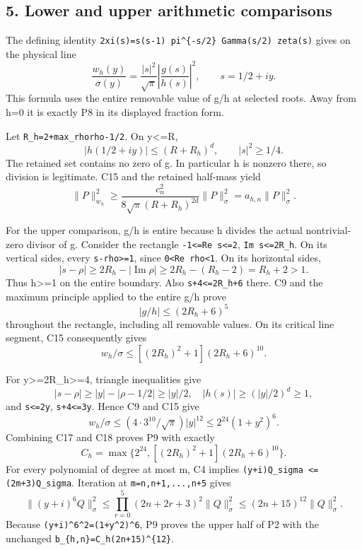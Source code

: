 \subsection{5. Lower and upper arithmetic comparisons}\label{mrcoerc:lower-and-upper-arithmetic-comparisons}

The defining identity \texttt{2xi(s)=s(s-1)\ pi\^{}\{-s/2\}\ Gamma(s/2)\ zeta(s)} gives on the physical line \[
\frac{w_h(y)}{\sigma(y)}=
 \frac{|s|^2}{\sqrt\pi}\left|\frac{g(s)}{h(s)}\right|^2,
 \qquad s=1/2+iy.
\tag{C15}
\] This formula uses the entire removable value of g/h at selected roots. Away from h=0 it is exactly P8 in its displayed fraction form.

Let \texttt{R\_h=2+max\_rho\textbar{}rho-1/2\textbar{}}. On \textbar y\textbar\textless=R, \[
|h(1/2+iy)|\le(R+R_h)^d,\qquad |s|^2\ge1/4.
\] The retained set contains no zero of g. In particular h is nonzero there, so division is legitimate. C15 and the retained half-mass yield \[
\|P\|_{w_h}^2\ge
\frac{c_n^2}{8\sqrt\pi(R+R_h)^{2d}}\|P\|_\sigma^2
=a_{h,n}\|P\|_\sigma^2.
\tag{C16}
\]

For the upper comparison, g/h is entire because h divides the actual nontrivial-zero divisor of g. Consider the rectangle \texttt{-1\textless{}=Re\ s\textless{}=2}, \texttt{\textbar{}Im\ s\textbar{}\textless{}=2R\_h}. On its vertical sides, every \texttt{\textbar{}s-rho\textbar{}\textgreater{}=1}, since \texttt{0\textless{}Re\ rho\textless{}1}. On its horizontal sides, \[
|s-\rho|\ge2R_h-|\operatorname{Im}\rho|
 \ge2R_h-(R_h-2)=R_h+2>1.
\] Thus \textbar h\textbar\textgreater=1 on the entire boundary. Also \texttt{\textbar{}s\textbar{}+4\textless{}=2R\_h+6} there. C9 and the maximum principle applied to the entire g/h prove \[
|g/h|\le(2R_h+6)^5
\] throughout the rectangle, including all removable values. On its critical line segment, C15 consequently gives \[
w_h/\sigma\le[(2R_h)^2+1](2R_h+6)^{10}.
\tag{C17}
\]

For \textbar y\textbar\textgreater=2R\_h\textgreater=4, triangle inequalities give \[
|s-\rho|\ge|y|-|\rho-1/2|\ge|y|/2,\quad
|h(s)|\ge(|y|/2)^d\ge1,
\] and \texttt{\textbar{}s\textbar{}\textless{}=2\textbar{}y\textbar{}}, \texttt{\textbar{}s\textbar{}+4\textless{}=3\textbar{}y\textbar{}}. Hence C9 and C15 give \[
w_h/\sigma\le(4\cdot3^{10}/\sqrt\pi)|y|^{12}
 \le2^{24}(1+y^2)^6.
\tag{C18}
\] Combining C17 and C18 proves P9 with exactly \[
C_h=\max\{2^{24},[(2R_h)^2+1](2R_h+6)^{10}\}.
\] For every polynomial of degree at most m, C4 implies \texttt{\textbar{}\textbar{}(y+i)Q\textbar{}\textbar{}\_sigma\ \textless{}=(2m+3)\textbar{}\textbar{}Q\textbar{}\textbar{}\_sigma}. Iteration at \texttt{m=n,n+1,...,n+5} gives \[
\|(y+i)^6Q\|_\sigma^2\le
 \prod_{r=0}^5(2n+2r+3)^2\|Q\|_\sigma^2
 \le(2n+15)^{12}\|Q\|_\sigma^2.
\] Because \texttt{\textbar{}(y+i)\^{}6\textbar{}\^{}2=(1+y\^{}2)\^{}6}, P9 proves the upper half of P2 with the unchanged \texttt{b\_\{h,n\}=C\_h(2n+15)\^{}\{12\}}.

